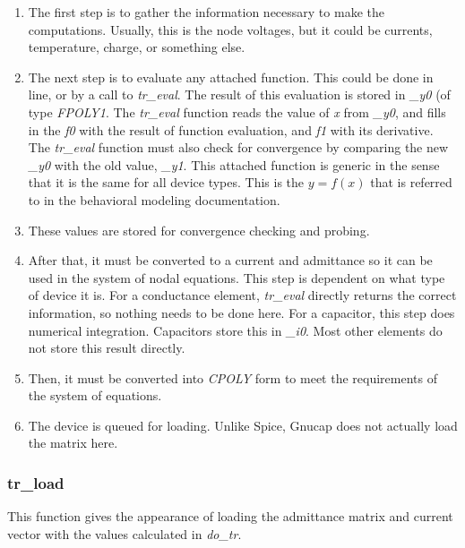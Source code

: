 \begin{enumerate}

\item The first step is to gather the information necessary to make
the computations.  Usually, this is the node voltages, but it could be 
currents, temperature, charge, or something else.

\item The next step is to evaluate any attached function.  This could
be done in line, or by a call to {\em tr\_eval}.  The result of this
evaluation is stored in {\em \_y0} (of type {\em FPOLY1}.  The {\em tr\_eval} 
function reads the value of {\em x} from {\em \_y0}, and fills in the
{\em f0} with the result of function evaluation, and {\em f1} with its 
derivative.  The {\em tr\_eval} function must also check for
convergence by comparing the new {\em \_y0} with the old value, {\em
\_y1}.  This attached function is generic in the sense that it is the
same for all device types.  This is the $y = f(x)$ that is referred to 
in the behavioral modeling documentation.

\item These values are stored for convergence checking and probing.

\item After that, it must be converted to a current and admittance so
it can be used in the system of nodal equations.  This step is
dependent on what type of device it is.  For a conductance element,
{\em tr\_eval} directly returns the correct information, so nothing
needs to be done here.  For a capacitor, this step does numerical
integration.  Capacitors store this in {\em \_i0}.  Most other elements 
do not store this result directly.

\item Then, it must be converted into {\em CPOLY} form to meet the
requirements of the system of equations.

\item The device is queued for loading.  Unlike Spice, Gnucap does not
actually load the matrix here.

\end{enumerate}


\subsubsection{tr\_load}

This function gives the appearance of loading the admittance matrix
and current vector with the values calculated in {\em do\_tr}.

